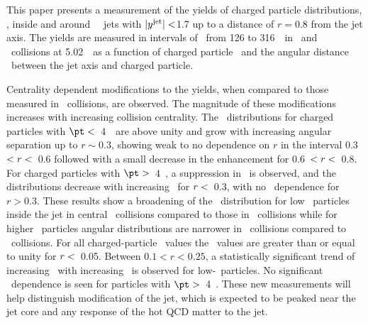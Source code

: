 
This paper presents a measurement of the yields of charged particle distributions, \Dptr, inside and around \RFour\ \antikt\ jets with $|\mbox{$y^{\mathrm{jet}}$}| <$1.7 up to a distance of $r = 0.8$ from the jet axis. The yields are measured in intervals of \ptjet\ from 126 to 316~\GeV\ in \PbPb\ and \pp\ collisions at 5.02~\TeV\ as a function of charged particle \pt\ and the angular distance \rvar\ between the jet axis and charged particle.

Centrality dependent modifications to the yields, when compared to those measured in \pp\ collisions, are observed. The magnitude of these modifications increases with increasing collision centrality. 
The \RDptr\ distributions for charged particles with $\pt <$~4~\GeV\ 
are above unity and 
grow with increasing angular separation up to $r \sim0.3$, showing weak to no dependence on $r$ in the interval 0.3~$< \mbox{$r$} <$~0.6 followed with a small decrease in the enhancement for 0.6~$< \mbox{$r$} <$~0.8.
For charged particles with $\pt >$~4~\GeV, a suppression in \RDptr\ is observed, and the 
distributions decrease with increasing
\rvar\ for $\mbox{$r$} < $~0.3, with no \rvar\ dependence for $r>0.3$. 
These results show a broadening of the \Dptr\ distribution for low \pt\ particles inside the jet
in central \pbpb\ collisions compared to those in \pp\ collisions while for higher \pt\ particles
angular distributions are narrower in \pbpb\ collisions compared to \pp\ collisions.
For all charged-particle \pt\ values the \RDptr\ values are greater than or equal to unity for
$\mbox{$r$} <$~0.05.
Between $0.1 < r < 0.25$, a statistically significant trend of increasing \RDptr\ with increasing \ptjet\ is observed for low-\pt\ particles. No significant \ptjet\ dependence is seen for particles  with $\pt >$~4~\GeV.
These new measurements will help distinguish modification of the jet, which is expected to be peaked near the jet core and 
any response of the hot QCD matter to the jet.

